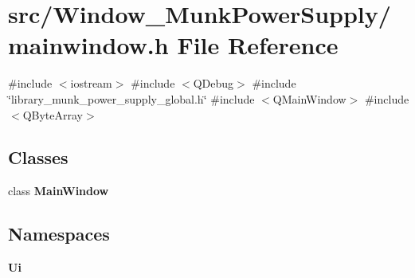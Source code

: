 \section{src/\+Window\+\_\+\+Munk\+Power\+Supply/mainwindow.h File Reference}
\label{_window___munk_power_supply_2mainwindow_8h}
{\ttfamily \#include $<$iostream$>$}\newline
{\ttfamily \#include $<$Q\+Debug$>$}\newline
{\ttfamily \#include \char`\"{}library\+\_\+munk\+\_\+power\+\_\+supply\+\_\+global.\+h\char`\"{}}\newline
{\ttfamily \#include $<$Q\+Main\+Window$>$}\newline
{\ttfamily \#include $<$Q\+Byte\+Array$>$}\newline
\subsection*{Classes}
\begin{DoxyCompactItemize}
\item 
class \textbf{ Main\+Window}
\end{DoxyCompactItemize}
\subsection*{Namespaces}
\begin{DoxyCompactItemize}
\item 
 \textbf{ Ui}
\end{DoxyCompactItemize}
